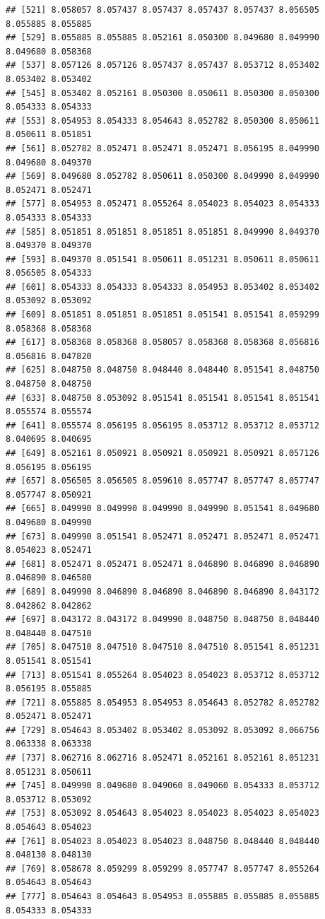 \documentclass[
]{article}
\begin{document}
\begin{verbatim}
## [521] 8.058057 8.057437 8.057437 8.057437 8.057437 8.056505 8.055885 8.055885
## [529] 8.055885 8.055885 8.052161 8.050300 8.049680 8.049990 8.049680 8.058368
## [537] 8.057126 8.057126 8.057437 8.057437 8.053712 8.053402 8.053402 8.053402
## [545] 8.053402 8.052161 8.050300 8.050611 8.050300 8.050300 8.054333 8.054333
## [553] 8.054953 8.054333 8.054643 8.052782 8.050300 8.050611 8.050611 8.051851
## [561] 8.052782 8.052471 8.052471 8.052471 8.056195 8.049990 8.049680 8.049370
## [569] 8.049680 8.052782 8.050611 8.050300 8.049990 8.049990 8.052471 8.052471
## [577] 8.054953 8.052471 8.055264 8.054023 8.054023 8.054333 8.054333 8.054333
## [585] 8.051851 8.051851 8.051851 8.051851 8.049990 8.049370 8.049370 8.049370
## [593] 8.049370 8.051541 8.050611 8.051231 8.050611 8.050611 8.056505 8.054333
## [601] 8.054333 8.054333 8.054333 8.054953 8.053402 8.053402 8.053092 8.053092
## [609] 8.051851 8.051851 8.051851 8.051541 8.051541 8.059299 8.058368 8.058368
## [617] 8.058368 8.058368 8.058057 8.058368 8.058368 8.056816 8.056816 8.047820
## [625] 8.048750 8.048750 8.048440 8.048440 8.051541 8.048750 8.048750 8.048750
## [633] 8.048750 8.053092 8.051541 8.051541 8.051541 8.051541 8.055574 8.055574
## [641] 8.055574 8.056195 8.056195 8.053712 8.053712 8.053712 8.040695 8.040695
## [649] 8.052161 8.050921 8.050921 8.050921 8.050921 8.057126 8.056195 8.056195
## [657] 8.056505 8.056505 8.059610 8.057747 8.057747 8.057747 8.057747 8.050921
## [665] 8.049990 8.049990 8.049990 8.049990 8.051541 8.049680 8.049680 8.049990
## [673] 8.049990 8.051541 8.052471 8.052471 8.052471 8.052471 8.054023 8.052471
## [681] 8.052471 8.052471 8.052471 8.046890 8.046890 8.046890 8.046890 8.046580
## [689] 8.049990 8.046890 8.046890 8.046890 8.046890 8.043172 8.042862 8.042862
## [697] 8.043172 8.043172 8.049990 8.048750 8.048750 8.048440 8.048440 8.047510
## [705] 8.047510 8.047510 8.047510 8.047510 8.051541 8.051231 8.051541 8.051541
## [713] 8.051541 8.055264 8.054023 8.054023 8.053712 8.053712 8.056195 8.055885
## [721] 8.055885 8.054953 8.054953 8.054643 8.052782 8.052782 8.052471 8.052471
## [729] 8.054643 8.053402 8.053402 8.053092 8.053092 8.066756 8.063338 8.063338
## [737] 8.062716 8.062716 8.052471 8.052161 8.052161 8.051231 8.051231 8.050611
## [745] 8.049990 8.049680 8.049060 8.049060 8.054333 8.053712 8.053712 8.053092
## [753] 8.053092 8.054643 8.054023 8.054023 8.054023 8.054023 8.054643 8.054023
## [761] 8.054023 8.054023 8.054023 8.048750 8.048440 8.048440 8.048130 8.048130
## [769] 8.058678 8.059299 8.059299 8.057747 8.057747 8.055264 8.054643 8.054643
## [777] 8.054643 8.054643 8.054953 8.055885 8.055885 8.055885 8.054333 8.054333

\end{verbatim}
\end{document}
